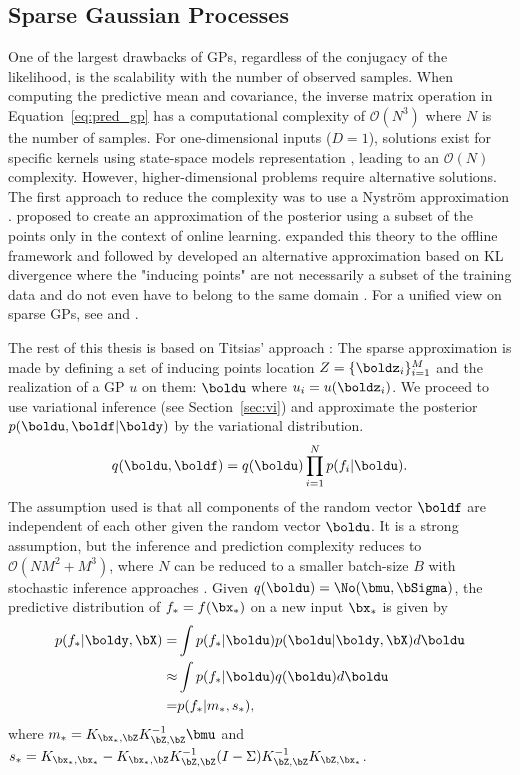 \subsection{Sparse Gaussian Processes}
\label{sec:sparsegps}
One of the largest drawbacks of \acp{GP}, regardless of the conjugacy of the likelihood, is the scalability with the number of observed samples.
When computing the predictive mean and covariance, the inverse matrix operation in Equation~\eqref{eq:pred_gp} has a computational complexity of $\mathcal{O}(N^3)$ where $N$ is the number of samples.
For one-dimensional inputs ($D=1$), solutions exist for specific kernels using state-space models representation \cite{pmlr-v9-turner10a,solinInfiniteHorizonGaussianProcesses2018}, leading to an $\mathcal{O}(N)$ complexity.
However, higher-dimensional problems require alternative solutions.
The first approach to reduce the complexity was to use a Nystr\"om approximation \cite{williams2002observations}.
\citet{csato2002sparse} proposed to create an approximation of the posterior using a subset of the points only in the context of online learning.
\citet{snelsonSparseGaussianProcesses2009} expanded this theory to the offline framework and \citet{csato2002gaussian} followed by \citet{Titsias2009} developed an alternative approximation based on KL divergence where the "inducing points" are not necessarily a subset of the training data and do not even have to belong to the same domain \cite{NIPS2009_5ea1649a, vdw2020framework}.
For a unified view on sparse \acp{GP}, see \citet{quinonero2005unifying} and \citet{bui2017unifying}.

The rest of this thesis is based on Titsias' approach \cite{Titsias2009}:
The sparse approximation is made by defining a set of inducing points location $Z=\{\boldz_i\}_{i=1}^M$ and the realization of a \ac{GP} $u$ on them: $\boldu$ where $u_i = u(\boldz_i)$.
We proceed to use variational inference (see Section~\ref{sec:vi}) and approximate the posterior $p(\boldu,\boldf|\boldy)$ by the variational distribution.
\begin{align}
    q(\boldu,\boldf) = q(\boldu)\prod_{i=1}^N p(f_i|\boldu).
    \label{eq:titsias_assumption}
\end{align}
The assumption used is that all components of the random vector $\boldf$ are independent of each other given the random vector $\boldu$.
It is a strong assumption, but the inference and prediction complexity reduces to $\mathcal{O}(NM^2 + M^3)$, where $N$ can be reduced to a smaller batch-size $B$ with stochastic inference approaches \cite{Hensman2013, Hensman2015}.
Given $q(\boldu) = \No(\bmu,\bSigma)$, the predictive distribution of $f_*=f(\bx_*)$ on a new input $\bx_*$ is given by
\begin{align*}
    p(f_*|\boldy,\bX) =& \int p(f_*|\boldu) p(\boldu|\boldy,\bX)d\boldu\\
    \approx& \int p(f_*|\boldu) q(\boldu)d\boldu\\
    =& p(f_*|m_*,s_*),
\end{align*}
where $m_* = K_{\bx_*,\bZ} K^{-1}_{\bZ,\bZ} \bmu$ and $s_* = K_{\bx_*,\bx_*} - K_{\bx_*,\bZ}K_{\bZ,\bZ}^{-1}(I - \Sigma) K^{-1}_{\bZ,\bZ}K_{\bZ,\bx_*}$.

